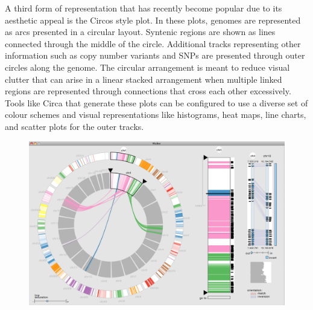 A third form of representation that has recently become popular due to its aesthetic appeal is the Circos style plot\cite{krzywinski2009circos}. In these plots, genomes are represented as arcs presented in a circular layout. Syntenic regions are shown as lines connected through the middle of the circle. Additional tracks representing other information such as copy number variants and SNPs are presented through outer circles along the genome. The circular arrangement is meant to reduce visual clutter that can arise in a linear stacked arrangement when multiple linked regions are represented through connections that cross each other excessively. Tools like Circa that generate these plots can be configured to use a diverse set of colour schemes and visual representations like histograms, heat maps, line charts, and scatter plots for the outer tracks\cite{circa}. 

\begin{figure}
  \centering
  \includegraphics[width=0.75\linewidth]{images/ch_2_mizbee.PNG}
  \label{fig:ch_2_mizbee}
\end{figure}

